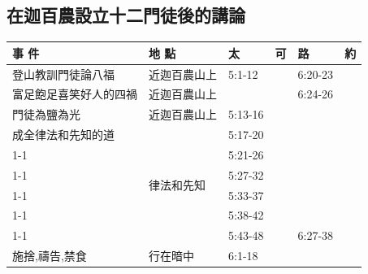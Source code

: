  
 
 \subsection{在迦百農設立十二門徒後的講論}
\begin{table}[H]
\centering 
\begin{tabular}{p{13.07em}|p{8.43em}|p{5.285em}|p{5.57em}|p{5.285em}|p{4.855em}}
\toprule
\textbf{事 件} & \textbf{地 點} & \textbf{太} & \textbf{可} & \textbf{路} & \textbf{約} \\\midrule


登山教訓門徒論八福& 近迦百農山上  & 5:1-12& \multicolumn{1}{r|}{} & \multicolumn{1}{l|}{6:20-23} & \multicolumn{1}{r}{} \\    \midrule

富足飽足喜笑好人的四禍& 近迦百農山上&  & \multicolumn{1}{r|}{} & \multicolumn{1}{l|}{6:24-26} & \multicolumn{1}{r}{} \\    \midrule

門徒為鹽為光& 近迦百農山上& 5:13-16& \multicolumn{1}{r|}{} & \multicolumn{1}{r|}{} & \multicolumn{1}{r}{} \\    \midrule

成全律法和先知的道&\multicolumn{1}{l|}{\multirow{6}{*}{律法和先知}}& 5:17-20& \multicolumn{1}{r|}{} & \multicolumn{1}{r|}{} & \multicolumn{1}{r}{} \\   
\cmidrule{1-1}\cmidrule{3-6}{不可殺人愛仇敵}&& 5:21-26& \multicolumn{1}{r|}{} & \multicolumn{1}{r|}{} & \multicolumn{1}{r}{} \\   
\cmidrule{1-1}\cmidrule{3-6}{不可姦淫休妻}&   & 5:27-32& \multicolumn{1}{r|}{} & \multicolumn{1}{r|}{} & \multicolumn{1}{r}{} \\    
\cmidrule{1-1}\cmidrule{3-6}{不可背誓}&   & 5:33-37& \multicolumn{1}{r|}{} & \multicolumn{1}{r|}{} & \multicolumn{1}{r}{} \\   
\cmidrule{1-1}\cmidrule{3-6}{以眼還眼，以牙還牙}&   & 5:38-42& \multicolumn{1}{r|}{} & \multicolumn{1}{r|}{} & \multicolumn{1}{r}{} \\   
\cmidrule{1-1}\cmidrule{3-6}{愛鄰舍恨仇敵}&  & 5:43-48& \multicolumn{1}{r|}{} & \multicolumn{1}{l|}{6:27-38} & \multicolumn{1}{r}{} \\    \midrule

施捨,禱告,禁食&\multicolumn{1}{l|}{\multirow{1}{*}{行在暗中}}& 6:1-18& \multicolumn{1}{r|}{} & \multicolumn{1}{r|}{} & \multicolumn{1}{r}{} \\  \midrule



\end{tabular}
\end{table}
